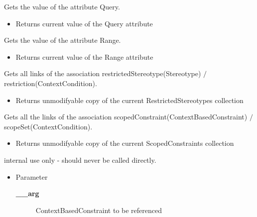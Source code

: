 \begin{desc}Gets the value of the attribute Query.
\begin{itemize}
\item{Returns current value of the Query attribute }
\end{itemize}
\end{desc}

\begin{desc}Gets the value of the attribute Range.
\begin{itemize}
\item{Returns current value of the Range attribute }
\end{itemize}
\end{desc}

\begin{desc}Gets all links of the association restrictedStereotype(Stereotype)
 $/$ restriction(ContextCondition).
\begin{itemize}
\item{Returns unmodifyable copy of the current RestrictedStereotypes collection }
\end{itemize}
\end{desc}

\begin{desc}Gets all the links of the association scopedConstraint(ContextBasedConstraint)
 $/$ scopeSet(ContextCondition).
\begin{itemize}
\item{Returns unmodifyable copy of the current ScopedConstraints collection }
\end{itemize}
\end{desc}

\begin{desc}internal use only - should never be called directly.
\begin{itemize}
\item{Parameter
  \begin{description}
   \item[{\bf \_\_arg}]{ContextBasedConstraint to be referenced}
  \end{description}}
\end{itemize}
\end{desc}

